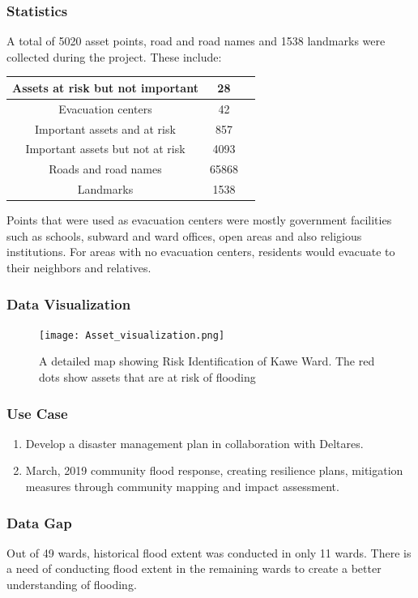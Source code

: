 \documentclass[a4paper,12pt,twoside]{article}
\begin{document}
\subsubsection{Statistics}
A total of 5020 asset points, road and road names and 1538 landmarks were collected during the project. These include:
\begin{center}
\begin{tabular}{ |c|c|c| }
 \hline
 Assets at risk but not important & 28 \\ 
 \hline
 Evacuation centers & 42 \\ 
 \hline
 Important assets and at risk & 857 \\
 \hline
 Important assets but not at risk & 4093 \\
 \hline
 Roads and road names & 65868 \\
 \hline
 Landmarks & 1538 \\
 \hline 
\end{tabular}
\end{center}
Points that were used as evacuation centers were mostly government facilities such as schools, subward and ward offices, open areas and also religious institutions. For areas with no evacuation centers, residents would evacuate to their neighbors and relatives.

\subsubsection{Data Visualization}
\begin{figure}[h]
{\color{RHgreen}\caption{A detailed map showing Risk Identification of Kawe Ward. The red dots show assets that are at risk of flooding}}
 \centering
 \texttt{[image: Asset\_visualization.png]}
\end{figure}

\subsubsection{Use Case}
\begin{enumerate}
    \item Develop a disaster management plan in collaboration with Deltares.
    \item March, 2019 community flood response, creating resilience plans, mitigation measures through community mapping and impact assessment.
\end{enumerate}


\subsubsection{Data Gap}
Out of 49 wards, historical flood extent was conducted in only 11 wards. There is a need of conducting flood extent in the remaining wards to create a better understanding of flooding.
\end{document}
